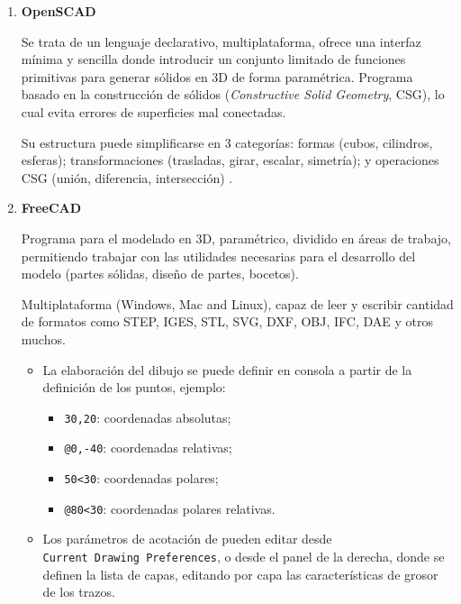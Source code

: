 \begin{enumerate}
\def\labelenumi{\arabic{enumi}.}
\item
  \textbf{OpenSCAD\cite{OpenSCAD}}\label{header-n97}

Se trata de un lenguaje declarativo, multiplataforma, ofrece una
interfaz mínima y sencilla donde introducir un conjunto limitado de
funciones primitivas para generar sólidos en 3D de forma paramétrica.
Programa basado en la construcción de sólidos (\emph{Constructive Solid
Geometry}, CSG), lo cual evita errores de superficies mal conectadas.

Su estructura puede simplificarse en 3 categorías: formas (cubos,
cilindros, esferas); transformaciones (trasladas, girar, escalar,
simetría); y operaciones CSG (unión, diferencia, intersección)
\cite{iamwil,CheatSheet,howtoOpenSCAD}.

\item
  \textbf{FreeCAD} \cite{FreeCAD}

Programa para el modelado en 3D, paramétrico, dividido en áreas de
trabajo, permitiendo trabajar con las utilidades necesarias para el
desarrollo del modelo (partes sólidas, diseño de partes, bocetos).

Multiplataforma (Windows, Mac and Linux), capaz de leer y escribir
cantidad de formatos como STEP, IGES, STL, SVG, DXF, OBJ, IFC, DAE y
otros muchos.

  \begin{itemize}
  \item
    La elaboración del dibujo se puede definir en consola a partir de la
  definición de los puntos, ejemplo:

    \begin{itemize}
    \item
    \texttt{30,20}: coordenadas absolutas;
    \item
      \texttt{@0,-40}: coordenadas relativas;
    \item
      \texttt{50\textless{}30}: coordenadas polares;
    \item
      \texttt{@80\textless{}30}: coordenadas polares relativas.
   \end{itemize}

   \item
  Los parámetros de acotación de pueden editar desde
  \texttt{Current\ Drawing\ Preferences}, o desde el panel de la
  derecha, donde se definen la lista de capas, editando por capa las
  características de grosor de los trazos.
   \end{itemize}


\end{enumerate}
